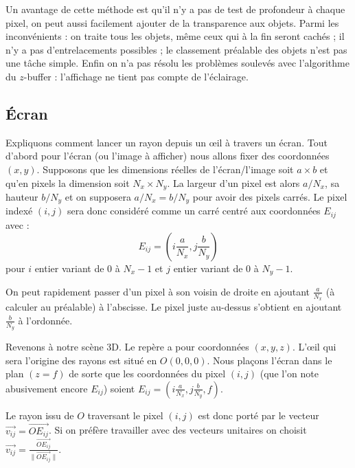 \documentclass[11pt,class=report,crop=false]{standalone}
\begin{document}

Un avantage de cette méthode est qu'il n'y a pas de test de profondeur à chaque pixel, on peut aussi facilement ajouter de la transparence aux objets.
Parmi les inconvénients :
on traite tous les objets, même ceux qui à la fin seront cachés ;
il n'y a pas d'entrelacements possibles ;
le classement préalable des objets n'est pas une tâche simple.
Enfin on n'a pas résolu les problèmes soulevés avec l'algorithme du $z$-buffer : l'affichage ne tient pas compte de l'éclairage.

\subsection{Écran}


Expliquons comment lancer un rayon depuis un \oe il à travers un écran.
Tout d'abord pour l'écran (ou l'image à afficher) nous allons fixer des coordonnées $(x,y)$. 
Supposons que les dimensions réelles de l'écran/l'image soit $a \times b$
et qu'en pixels la dimension soit $N_x \times N_y$. La largeur d'un pixel est alors $a/N_x$, sa hauteur $b/N_y$ et on supposera $a/N_x = b/N_y$ pour avoir des pixels carrés.
Le pixel indexé $(i,j)$ sera donc considéré comme un carré centré aux coordonnées $E_{ij}$ avec :
$$E_{ij} = \left( i \frac{a}{N_x}, j \frac{b}{N_y} \right)$$
pour $i$ entier variant de $0$ à $N_x-1$ et $j$ entier variant de $0$ à $N_y-1$.


On peut rapidement passer d'un pixel à son voisin de droite en ajoutant $\frac{a}{N_x}$ (à calculer au préalable) à l'abscisse. Le pixel juste au-dessus s'obtient en ajoutant $\frac{b}{N_y}$ à l'ordonnée.

Revenons à notre scène 3D. Le repère a pour coordonnées $(x,y,z)$. 
L'\oe{}il qui sera l'origine des rayons est situé en $O(0,0,0)$. 
Nous plaçons l'écran dans le plan $(z=f)$ de sorte que les coordonnées du pixel $(i,j)$ (que l'on note abusivement encore $E_{ij}$) soient $E_{ij} = \left( i \frac{a}{N_x}, j \frac{b}{N_y}, f \right)$.

Le rayon issu de $O$ traversant le pixel $(i,j)$ est donc porté par le vecteur $\vec{v_{ij}} = \vec{OE_{ij}}$. Si on préfère travailler avec des vecteurs unitaires on choisit $\vec{v_{ij}} = \frac{\vec{OE_{ij}}}{\| \vec{OE_{ij}} \|} $.
\end{document}
